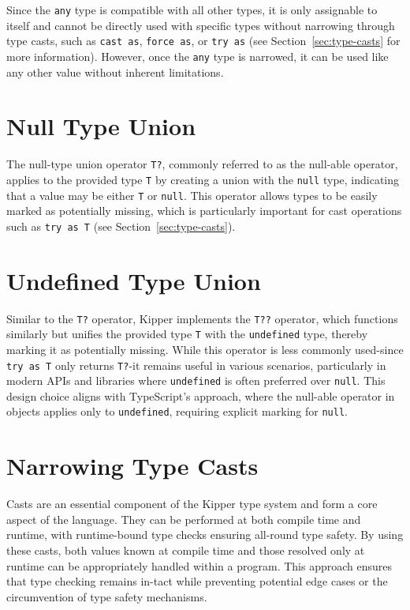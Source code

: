 Since the \lstinline|any| type is compatible with all other types, it is only assignable to itself and cannot be directly used with specific types without narrowing through type casts, such as \lstinline|cast as|, \lstinline|force as|, or \lstinline|try as| (see Section~\ref{sec:type-casts} for more information). However, once the \lstinline|any| type is narrowed, it can be used like any other value without inherent limitations.

\section{Null Type Union}
\label{sec:null-type-union}

The null-type union operator \lstinline|T?|, commonly referred to as the null-able operator, applies to the provided type \lstinline|T| by creating a union with the \lstinline|null| type, indicating that a value may be either \lstinline|T| or \lstinline|null|. This operator allows types to be easily marked as potentially missing, which is particularly important for cast operations such as \lstinline|try as T| (see Section~\ref{sec:type-casts}).

\section{Undefined Type Union}
\label{sec:undefined-type-union}

Similar to the \lstinline|T?| operator, Kipper implements the \lstinline|T??| operator, which functions similarly but unifies the provided type \lstinline|T| with the \lstinline|undefined| type, thereby marking it as potentially missing. While this operator is less commonly used-since \lstinline|try as T| only returns \lstinline|T?|-it remains useful in various scenarios, particularly in modern APIs and libraries where \lstinline|undefined| is often preferred over \lstinline|null|. This design choice aligns with TypeScript's approach, where the null-able operator in objects applies only to \lstinline|undefined|, requiring explicit marking for \lstinline|null|.

\section{Narrowing Type Casts}
\label{sec:type-casts}

Casts are an essential component of the Kipper type system and form a core aspect of the language. They can be performed at both compile time and runtime, with runtime-bound type checks ensuring all-round type safety. By using these casts, both values known at compile time and those resolved only at runtime can be appropriately handled within a program. This approach ensures that type checking remains in-tact while preventing potential edge cases or the circumvention of type safety mechanisms.

